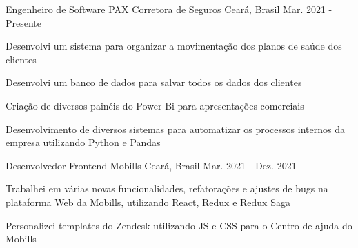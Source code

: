 

\begin{cventries}

  \cventry
    {Engenheiro de Software} %
    {PAX Corretora de
    Seguros} %
    {Ceará, Brasil} %
    {Mar. 2021 - Presente} %
    {
      \begin{cvitems} %
        \item {Desenvolvi um sistema para organizar a movimentação dos planos de saúde dos clientes}
        \item {Desenvolvi um banco de dados
        para salvar todos os dados dos clientes}
        \item {Criação de diversos painéis do Power Bi para apresentações comerciais}
        \item {Desenvolvimento de diversos
        sistemas para automatizar os processos internos da empresa utilizando Python e Pandas}
      \end{cvitems}
    }

  \cventry
    {Desenvolvedor Frontend} %
    {Mobills} %
    {Ceará, Brasil} %
    {Mar. 2021 - Dez. 2021} %
    {
      \begin{cvitems} %
        \item {Trabalhei em várias novas
        funcionalidades, refatorações e
        ajustes de bugs na plataforma Web
        da Mobills, utilizando React,
        Redux e Redux Saga}
        \item {Personalizei templates do Zendesk
        utilizando JS e CSS para o Centro
        de ajuda do Mobills}
      \end{cvitems}
    }

\end{cventries}
